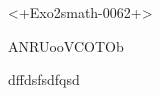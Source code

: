 
\begin{exercice}\label{exo2smath-0062}

<+Exo2smath-0062+>


ANRUooVCOTOb

\begin{center}
   
\end{center}


dffdsfsdfqsd

\end{exercice}
